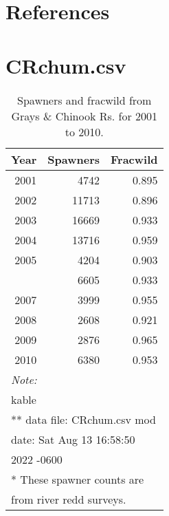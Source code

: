 \documentclass[
  letterpaper,
  oneside]{scrbook}
\newlength{\cslhangindent}
\newlength{\cslentryspacingunit} %
\newenvironment{CSLReferences}[2] %
 {%
  \setlength{\parindent}{0pt}
  \ifodd #1
  \let\oldpar\par
  \def\par{\hangindent=\cslhangindent\oldpar}
  \fi
  \setlength{\parskip}{#2\cslentryspacingunit}
 }%
 {}
\begin{document}

\hypertarget{references}{%
\chapter*{References}\label{references}}


\hypertarget{refs}{}
\begin{CSLReferences}{0}{0}
\end{CSLReferences}

\cleardoublepage
{}
{}
\appendix

\hypertarget{crchum.csv}{%
\chapter{CRchum.csv}\label{crchum.csv}}

\hypertarget{tbl-appA1}{}
\begin{table}
\caption{\label{tbl-appA1}Spawners and fracwild from Grays \& Chinook Rs. for 2001 to 2010. }\tabularnewline

\centering
\begin{tabular}[t]{rrr}
\toprule
Year & Spawners & Fracwild\\
\midrule
2001 & 4742 & 0.895\\
2002 & 11713 & 0.896\\
2003 & 16669 & 0.933\\
2004 & 13716 & 0.959\\
2005 & 4204 & 0.903\\
\addlinespace
2006 & 6605 & 0.933\\
2007 & 3999 & 0.955\\
2008 & 2608 & 0.921\\
2009 & 2876 & 0.965\\
2010 & 6380 & 0.953\\
\bottomrule
\multicolumn{3}{l}{\rule{0pt}{1em}\textit{Note: }}\\
\multicolumn{3}{l}{\rule{0pt}{1em}kable}\\
\multicolumn{3}{l}{\textsuperscript{} ** data file: CRchum.csv mod}\\
\multicolumn{3}{l}{date: Sat Aug 13 16:58:50}\\
\multicolumn{3}{l}{2022 -0600}\\
\multicolumn{3}{l}{\textsuperscript{} * These spawner counts are}\\
\multicolumn{3}{l}{from river redd surveys.}\\
\end{tabular}
\end{table}
\end{document}
